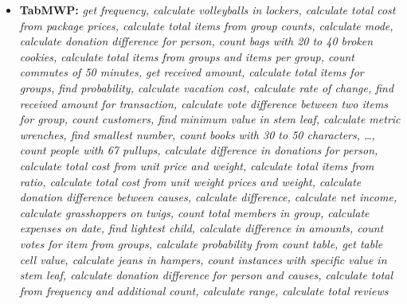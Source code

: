 \begin{itemize}[noitemsep, topsep=0pt]
    \item \textbf{TabMWP:} \textit{get frequency, calculate volleyballs in lockers, calculate total cost from package prices, calculate total items from group counts, calculate mode, calculate donation difference for person, count bags with 20 to 40 broken cookies, calculate total items from groups and items per group, count commutes of 50 minutes, get received amount, calculate total items for groups, find probability, calculate vacation cost, calculate rate of change, find received amount for transaction, calculate vote difference between two items for group, count customers, find minimum value in stem leaf, calculate metric wrenches, find smallest number, count books with 30 to 50 characters, \dots, count people with 67 pullups, calculate difference in donations for person, calculate total cost from unit price and weight, calculate total items from ratio, calculate total cost from unit weight prices and weight, calculate donation difference between causes, calculate difference, calculate net income, calculate grasshoppers on twigs, count total members in group, calculate expenses on date, find lightest child, calculate difference in amounts, count votes for item from groups, calculate probability from count table, get table cell value, calculate jeans in hampers, count instances with specific value in stem leaf, calculate donation difference for person and causes, calculate total from frequency and additional count, calculate range, calculate total reviews}
\end{itemize}


